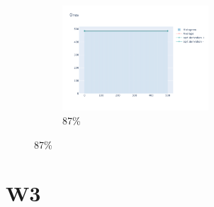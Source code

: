 \documentclass[12pt, fleqn]{report}                             %
\theoremstyle{break}                                            %
\begin{document}
\begin{figure}[ht!]
\begin{subfigure}[b]{0.4\linewidth}
          \includegraphics[width=0.6\textwidth]{Images/232/dia-d.png}
          \caption{87\%}
        \end{subfigure}
      \end{figure}






















      \clearpage
      \section{W3}



            
\end{document}
